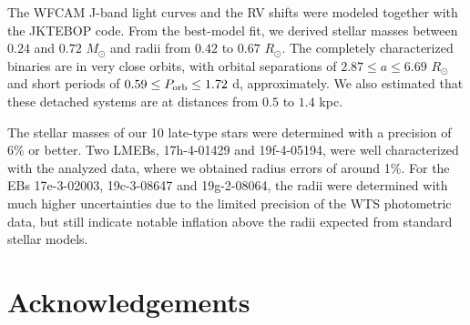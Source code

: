 \documentclass[fleqn,usenatbib]{mnras}
\begin{document}
The WFCAM J-band light curves and the RV shifts were modeled together with the JKTEBOP code. From the best-model fit, we derived stellar masses between $0.24$ and $0.72$ $M_{\odot}$ and radii from $0.42$ to $0.67$ $R_{\odot}$. The completely characterized binaries are in very close orbits, with orbital separations of $2.87 \leq a \leq 6.69$ $R_{\odot}$ and short periods of $0.59 \leq P_{\rm orb} \leq 1.72$ d, approximately. We also estimated that these detached systems are at distances from $0.5$ to $1.4$ kpc.

The stellar masses of our 10 late-type stars were determined with a precision of 6\% or better.
Two LMEBs, 17h-4-01429 and 19f-4-05194, were well characterized with the analyzed data, where we obtained radius errors of around 1\%. For the EBs 17e-3-02003, 19c-3-08647 and 19g-2-08064, the radii were determined with much higher uncertainties due to the limited precision of the WTS photometric data, but still indicate notable inflation above the radii expected from standard stellar models. 




\section*{Acknowledgements}
\end{document}
